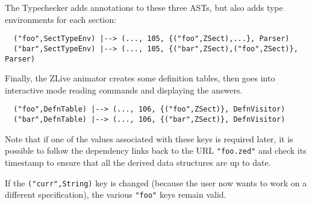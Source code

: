 \documentclass{llncs} %
\begin{document}
The Typechecker adds annotations to these three ASTs,
but also adds type environments for each section:
\begin{small}
\begin{verbatim}
  ("foo",SectTypeEnv) |--> (..., 105, {("foo",ZSect),...}, Parser)
  ("bar",SectTypeEnv) |--> (..., 105, {("bar",ZSect),("foo",ZSect)}, Parser)
\end{verbatim}
\end{small}

Finally, the ZLive animator creates some definition tables, then goes into
interactive mode reading commands and displaying the answers. 
\begin{small}
\begin{verbatim}
  ("foo",DefnTable) |--> (..., 106, {("foo",ZSect)}, DefnVisitor)
  ("bar",DefnTable) |--> (..., 106, {("bar",ZSect)}, DefnVisitor)
\end{verbatim}
\end{small}

Note that if one of the values associated with these keys is
required later, it is possible to follow the dependency links
back to the URL \texttt{"foo.zed"} and check its timestamp to
ensure that all the derived data structures are up to date.

If the \texttt{("curr",String)} key is changed (because the
user now wants to work on a different specification), the
various \texttt{"foo"} keys remain valid.



\end{document}
